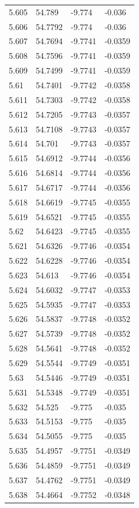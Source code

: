 \begin{tabular}{llll}
5.605 & 54.789 & -9.774 & -0.036 \\
5.606 & 54.7792 & -9.774 & -0.036 \\
5.607 & 54.7694 & -9.7741 & -0.0359 \\
5.608 & 54.7596 & -9.7741 & -0.0359 \\
5.609 & 54.7499 & -9.7741 & -0.0359 \\
5.61 & 54.7401 & -9.7742 & -0.0358 \\
5.611 & 54.7303 & -9.7742 & -0.0358 \\
5.612 & 54.7205 & -9.7743 & -0.0357 \\
5.613 & 54.7108 & -9.7743 & -0.0357 \\
5.614 & 54.701 & -9.7743 & -0.0357 \\
5.615 & 54.6912 & -9.7744 & -0.0356 \\
5.616 & 54.6814 & -9.7744 & -0.0356 \\
5.617 & 54.6717 & -9.7744 & -0.0356 \\
5.618 & 54.6619 & -9.7745 & -0.0355 \\
5.619 & 54.6521 & -9.7745 & -0.0355 \\
5.62 & 54.6423 & -9.7745 & -0.0355 \\
5.621 & 54.6326 & -9.7746 & -0.0354 \\
5.622 & 54.6228 & -9.7746 & -0.0354 \\
5.623 & 54.613 & -9.7746 & -0.0354 \\
5.624 & 54.6032 & -9.7747 & -0.0353 \\
5.625 & 54.5935 & -9.7747 & -0.0353 \\
5.626 & 54.5837 & -9.7748 & -0.0352 \\
5.627 & 54.5739 & -9.7748 & -0.0352 \\
5.628 & 54.5641 & -9.7748 & -0.0352 \\
5.629 & 54.5544 & -9.7749 & -0.0351 \\
5.63 & 54.5446 & -9.7749 & -0.0351 \\
5.631 & 54.5348 & -9.7749 & -0.0351 \\
5.632 & 54.525 & -9.775 & -0.035 \\
5.633 & 54.5153 & -9.775 & -0.035 \\
5.634 & 54.5055 & -9.775 & -0.035 \\
5.635 & 54.4957 & -9.7751 & -0.0349 \\
5.636 & 54.4859 & -9.7751 & -0.0349 \\
5.637 & 54.4762 & -9.7751 & -0.0349 \\
5.638 & 54.4664 & -9.7752 & -0.0348 \\

\end{tabular}
